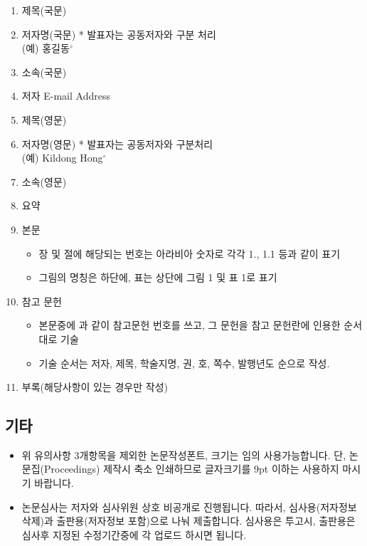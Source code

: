 \documentclass{kcc}
\newcommand{\cl}[1]{\textcircled{\scriptsize #1}}
\begin{document}
\begin{enumerate}[itemsep=0pt,parsep=0pt]
	\renewcommand{\theenumi}{\arabic{enumi}}
	\renewcommand{\labelenumi}{\cl\theenumi}
	\item 제목(국문)
	\item 저자명(국문) * 발표자는 공동저자와 구분 처리 \\ (예) 홍길동$^{\circ}$
	\item 소속(국문)
	\item 저자 E-mail Address
	\item 제목(영문)
	\item 저자명(영문) * 발표자는 공동저자와 구분처리 \\ (예) Kildong Hong$^{\circ}$
	\item 소속(영문)
	\item 요약
	\item 본문
	\begin{itemize}[itemsep=0pt,parsep=0pt]
	  \item 장 및 절에 해당되는 번호는  아라비아 숫자로 각각 1., 1.1 등과 같이 표기
	  \item 그림의 명칭은 하단에, 표는 상단에 그림 1 및 표 1로 표기
	\end{itemize} 
	\item 참고 문헌
	\begin{itemize}[itemsep=0pt,parsep=0pt]
	  \item 본문중에 \cite{Lee:2008,Myung:2008,Lee:2010}과 같이 참고문헌 번호를 쓰고, 그 문헌을 참고 문헌란에 인용한 순서대로 기술
	  \item 기술 순서는 저자, 제목, 학술지명, 권, 호, 쪽수, 발행년도 순으로 작성.
	\end{itemize}
	\item 부록(해당사항이 있는 경우만 작성) 
\end{enumerate}



\subsection{기타}
\begin{itemize}[itemsep=0pt,parsep=0pt]
  \item 위 유의사항 3개항목을 제외한 논문작성폰트, 크기는 임의 사용가능합니다. 
  단, 논문집(Proceedings) 제작시 축소 인쇄하므로 글자크기를 9pt 이하는 사용하지 마시기 바랍니다.
  \item 논문심사는 저자와 심사위원 상호 비공개로 진행됩니다. 
  따라서, 심사용(저자정보 삭제)과 출판용(저자정보 포함)으로 나눠 제출합니다. 
  심사용은 투고시, 출판용은 심사후 지정된 수정기간중에 각 업로드 하시면 됩니다. 
\end{itemize}
\end{document}
